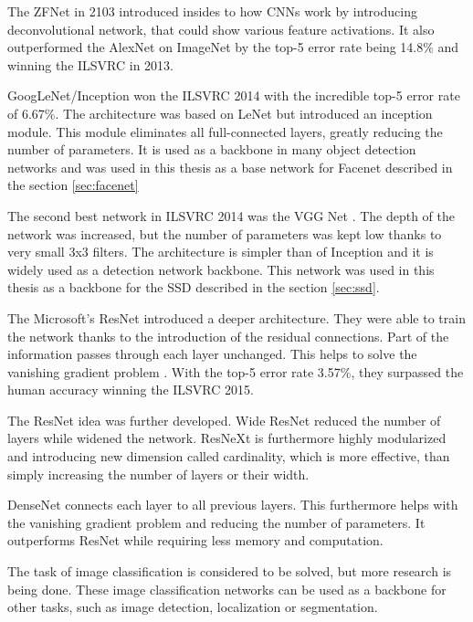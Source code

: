 \documentclass[a4paper,11pt,titlepage,twoside]{article}
\numberwithin{figure}{section}
\begin{document}
The ZFNet \cite{zeiler2014visualizing} in 2103 introduced insides to how CNNs work by introducing deconvolutional network, that could show various feature activations. It also outperformed the AlexNet on ImageNet by the top-5 error rate being 14.8\% and winning the ILSVRC in 2013.

GoogLeNet/Inception won the ILSVRC 2014 with the incredible top-5 error rate of 6.67\%. The architecture was based on LeNet \cite{lecun1998gradient} but introduced an inception module. This module eliminates all full-connected layers, greatly reducing the number of parameters. It is used as a backbone in many object detection networks and was used in this thesis as a base network for Facenet \cite{schroff2015facenet} described in the section \ref{sec:facenet}

The second best network in ILSVRC 2014 was the VGG Net \cite{simonyan2014very}. The depth of the network was increased, but the number of parameters was kept low thanks to very small 3x3 filters. The architecture is simpler than of Inception and it is widely used as a detection network backbone. This network was used in this thesis as a backbone for the SSD \cite{liu2016ssd} described in the section \ref{sec:ssd}. 

The Microsoft's ResNet \cite{he2016deep} introduced a deeper architecture. They were able to train the network thanks to the introduction of the residual connections. Part of the information passes through each layer unchanged. This helps to solve the vanishing gradient problem \cite{hochreiter1998vanishing}. With the top-5 error rate 3.57\%, they surpassed the human accuracy winning the ILSVRC 2015.

The ResNet idea was further developed. Wide ResNet \cite{zagoruyko2016wide} reduced the number of layers while widened the network. ResNeXt \cite{xie2017aggregated} is furthermore highly modularized and introducing new dimension called cardinality, which is more effective, than simply increasing the number of layers or their width. 

DenseNet \cite{huang2017densely} connects each layer to all previous layers. This furthermore helps with the vanishing gradient problem and reducing the number of parameters. It outperforms ResNet while requiring less memory and computation.

The task of image classification is considered to be solved, but more research is being done. These image classification networks can be used as a backbone for other tasks, such as image detection, localization or segmentation.
\end{document}
